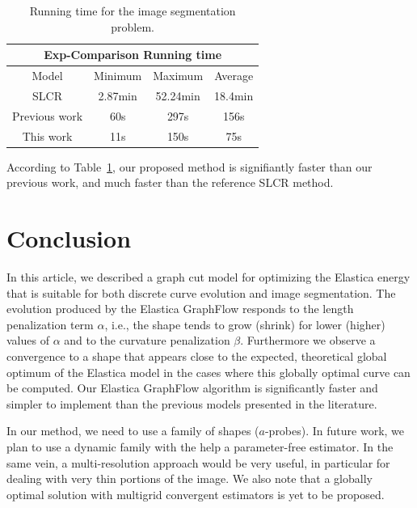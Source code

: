 \documentclass[runningheads]{llncs}
\begin{document}
\begin{table}[t]
  \centering
 \caption{Running time for the image segmentation problem.}
\label{ch9:tab:rtime-image-segmentation-general} 
\captionsetup{type=table}
\begin{tabular}{|c|c|c|c|}
\hline
\multicolumn{4}{|c|}{Exp-Comparison Running time}\\
\hline
Model & Minimum & Maximum & Average \\
\hline
SLCR & 2.87min & 52.24min & 18.4min\\
Previous work & 60s & 297s & 156s\\
This work  & 11s & 150s & 75s\\
\hline
\end{tabular}
\end{table}

According to Table~\ref{ch9:tab:rtime-image-segmentation-general}, our proposed method is signifiantly faster than
our previous work, and much faster than the reference SLCR method.

\section{Conclusion}
In this article, we described a graph cut model for optimizing the
Elastica energy that is suitable for both discrete curve evolution and
image segmentation. The evolution produced by the Elastica GraphFlow
responds to the length penalization term $\alpha$, i.e., the shape
tends to grow (shrink) for lower (higher) values of $\alpha$ and to
the curvature penalization $\beta$. Furthermore we observe a
convergence to a shape that appears close to the expected, theoretical
global optimum of the Elastica model in the cases where this globally
optimal curve can be computed. Our Elastica GraphFlow algorithm is
significantly faster and simpler to implement than the previous models
presented in the literature.

In our method, we need to use a family of shapes ($a$-probes). In future work, we plan to use a dynamic family with the
help a parameter-free estimator. In the same vein, a multi-resolution approach would be very useful, in particular for
dealing with very thin portions of the image. We also note that a globally optimal solution with multigrid convergent
estimators is yet to be proposed. 



\end{document}
